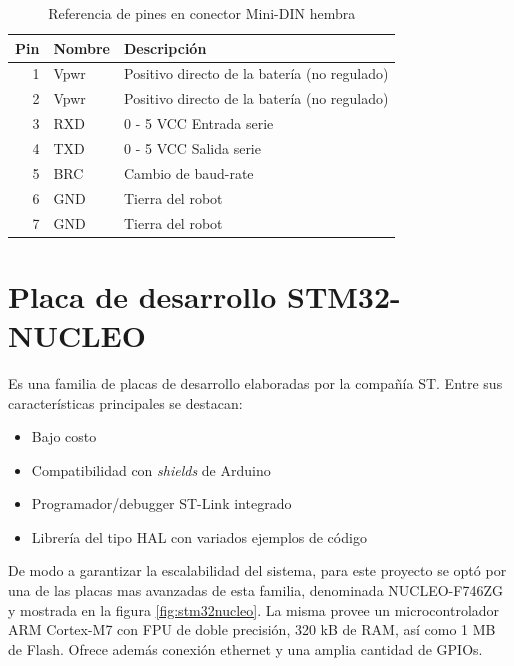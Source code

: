 \begin{table}[h]
    \centering
    \caption{Referencia de pines en conector Mini-DIN hembra}
    \label{tab:Pines}
    \begin{tabular}{rll}
        \toprule
        \multicolumn{1}{l}{Pin} & Nombre & Descripción                                  \\
        \midrule
        1                       & Vpwr   & Positivo directo de la batería (no regulado) \\
        2                       & Vpwr   & Positivo directo de la batería (no regulado) \\
        3                       & RXD    & 0 - 5 VCC Entrada serie                      \\
        4                       & TXD    & 0 - 5 VCC Salida serie                       \\
        5                       & BRC    & Cambio de baud-rate                          \\
        6                       & GND    & Tierra del robot                             \\
        7                       & GND    & Tierra del robot                             \\
        \bottomrule
    \end{tabular}
\end{table}

\section{Placa de desarrollo STM32-NUCLEO}

Es una familia de placas de desarrollo elaboradas por la compañía ST. Entre sus características principales se destacan:

\begin{itemize}
    \item Bajo costo
    \item Compatibilidad con \textit{shields} de Arduino
    \item Programador/debugger ST-Link integrado
    \item Librería del tipo HAL con variados ejemplos de código
\end{itemize}

De modo a garantizar la escalabilidad del sistema, para este proyecto se optó por una de las placas mas avanzadas de esta familia, denominada NUCLEO-F746ZG y mostrada en la figura \ref{fig:stm32nucleo}. La misma provee un microcontrolador ARM Cortex-M7 con FPU de doble precisión, 320 kB de RAM, así como 1 MB de Flash. Ofrece además conexión ethernet y una amplia cantidad de GPIOs.

